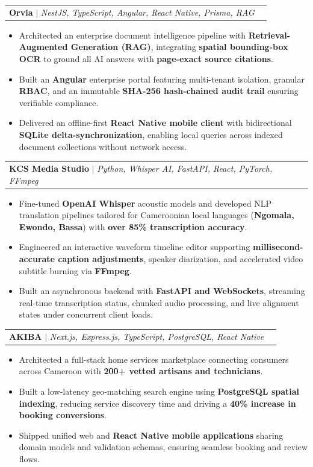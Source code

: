 \documentclass[letterpaper,10pt]{article}
\makeatletter
\newcommand{\resumeItem}[1]{
  \item\small{
    {#1 \vspace{-1.5pt}}
  }
}
\newcommand{\resumeProjectHeading}[2]{
    \item
    \begin{tabular*}{0.98\textwidth}{l@{\extracolsep{\fill}}r}
      \small#1 & #2 \\
    \end{tabular*}\vspace{-5pt}
}
\newcommand{\resumeItemListStart}{\begin{itemize}[leftmargin=0.2in, label={$\vcenter{\hbox{\tiny$\bullet$}}$}, itemsep=1.2pt, parsep=0pt]}
\newcommand{\resumeItemListEnd}{\end{itemize}\vspace{-3pt}}
\makeatother
\begin{document}
    \resumeProjectHeading
        {\textbf{Orvia} $|$ \emph{NestJS, TypeScript, Angular, React Native, Prisma, RAG}}{}
        \resumeItemListStart
          \resumeItem{Architected an enterprise document intelligence pipeline with \textbf{Retrieval-Augmented Generation (RAG)}, integrating \textbf{spatial bounding-box OCR} to ground all AI answers with \textbf{page-exact source citations}.}
          \resumeItem{Built an \textbf{Angular} enterprise portal featuring multi-tenant isolation, granular \textbf{RBAC}, and an immutable \textbf{SHA-256 hash-chained audit trail} ensuring verifiable compliance.}
          \resumeItem{Delivered an offline-first \textbf{React Native mobile client} with bidirectional \textbf{SQLite delta-synchronization}, enabling local queries across indexed document collections without network access.}
        \resumeItemListEnd

    \resumeProjectHeading
        {\textbf{KCS Media Studio} $|$ \emph{Python, Whisper AI, FastAPI, React, PyTorch, FFmpeg}}{}
        \resumeItemListStart
          \resumeItem{Fine-tuned \textbf{OpenAI Whisper} acoustic models and developed NLP translation pipelines tailored for Cameroonian local languages (\textbf{Ngomala, Ewondo, Bassa}) with \textbf{over 85\% transcription accuracy}.}
          \resumeItem{Engineered an interactive waveform timeline editor supporting \textbf{millisecond-accurate caption adjustments}, speaker diarization, and accelerated video subtitle burning via \textbf{FFmpeg}.}
          \resumeItem{Built an asynchronous backend with \textbf{FastAPI and WebSockets}, streaming real-time transcription status, chunked audio processing, and live alignment states under concurrent client loads.}
        \resumeItemListEnd

    \pagebreak

    \resumeProjectHeading
        {\textbf{AKIBA} $|$ \emph{Next.js, Express.js, TypeScript, PostgreSQL, React Native}}{}
        \resumeItemListStart
          \resumeItem{Architected a full-stack home services marketplace connecting consumers across Cameroon with \textbf{200+ vetted artisans and technicians}.}
          \resumeItem{Built a low-latency geo-matching search engine using \textbf{PostgreSQL spatial indexing}, reducing service discovery time and driving a \textbf{40\% increase in booking conversions}.}
          \resumeItem{Shipped unified web and \textbf{React Native mobile applications} sharing domain models and validation schemas, ensuring seamless booking and review flows.}
        \resumeItemListEnd
\end{document}
